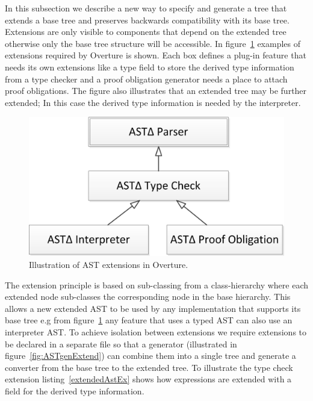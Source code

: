 \documentclass{overturerepchap}
\begin{document}
In this subsection we describe a new way to specify and generate a tree that extends a base tree and preserves backwards compatibility with its base tree. Extensions are only visible to components that depend on the extended tree otherwise only the base tree structure will be accessible. In figure~\ref{fig:ast_extensions} examples of extensions required by Overture is shown. Each box defines a plug-in feature that needs its own extensions like a type field to store the derived type information from a type checker and a proof obligation generator needs a place to attach proof obligations. The figure also illustrates that an extended tree may be further extended; In this case the derived type information is needed by the interpreter. 

\begin{figure}[tbh]
\centering
\includegraphics[width=.4\textwidth]{figures/ast_extensions}
\caption{Illustration of AST extensions in Overture.\label{fig:ast_extensions}}
\end{figure}

The extension principle is based on sub-classing from a class-hierarchy where each extended node sub-classes the corresponding node in the base hierarchy. This allows a new extended AST to be used by any implementation that supports its base tree e.g from figure~\ref{fig:ast_extensions} any feature that uses a typed AST can also use an interpreter AST.
To achieve isolation between extensions we require extensions to be declared in a separate file so that a generator (illustrated in figure~\ref{fig:ASTgenExtend}) can combine them into a single tree and generate a converter from the base tree to the extended tree. To illustrate the type check extension listing~\ref{extendedAstEx} shows how expressions are extended with a field for the derived type information.
\end{document}
